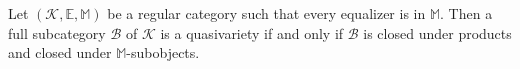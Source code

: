 Let $(\mathcal{K}, \mathbb{E}, \mathbb{M})$ be a regular category such that every equalizer is in $\mathbb{M}$. Then a full subcategory $\mathcal{B}$ of $\mathcal{K}$ is a quasivariety if and only if $\mathcal{B}$ is closed under products and closed under $\mathbb{M}$-subobjects.
